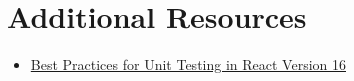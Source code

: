 \section{Additional Resources}

\begin{itemize}[leftmargin=*]
    \item \href{https://eng.uber.com/best-practices-for-react-v16/}{Best Practices for Unit Testing in React Version 16}
\end{itemize}
